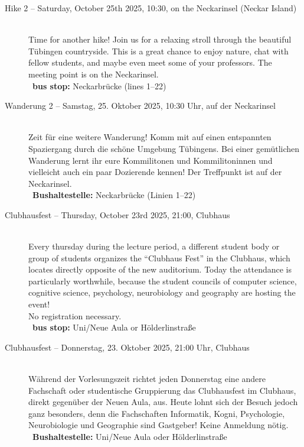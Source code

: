 \begin{description}
\ifml
    \item[Hike 2 -- Saturday, October 25th 2025, 10:30, on the Neckarinsel (Neckar Island)]~\\
    Time for another hike! Join us for a relaxing stroll through the beautiful Tübingen countryside.
    This is a great chance to enjoy nature, chat with fellow students, and maybe even meet some of your professors.
    The meeting point is on the Neckarinsel.\\
    ~\textbf{bus stop:} Neckarbrücke (lines 1--22)
\else
    \item[Wanderung 2 -- Samstag, 25. Oktober 2025, 10:30 Uhr, auf der Neckarinsel]~\\
    Zeit für eine weitere Wanderung! Komm mit auf einen entspannten Spaziergang durch die schöne Umgebung Tübingens.
    Bei einer gemütlichen Wanderung lernt ihr eure Kommilitonen und Kommilitoninnen
    und vielleicht auch ein paar Dozierende kennen!
    Der Treffpunkt ist auf der Neckarinsel.\\
    ~\textbf{Bushaltestelle:} Neckarbrücke (Linien 1--22)
\fi

\ifml
    \item[Clubhausfest -- Thursday, October 23rd 2025, 21:00, Clubhaus]\ \\
    Every thursday during the lecture period, a different student body or group of students organizes the "`Clubhaus Fest"' in
    the Clubhaus, which locates directly opposite of the new auditorium. Today the attendance is particularly worthwhile, because
    the student councils of computer science, cognitive science, psychology, neurobiology and geography are hosting the event! \\
    No registration necessary.\\
    ~\textbf{bus stop:} Uni/Neue Aula or Hölderlinstraße
\else
    \item[Clubhausfest -- Donnerstag, 23. Oktober 2025, 21:00 Uhr, Clubhaus]\ \\
    Während der Vorlesungszeit richtet jeden Donnerstag eine andere Fachschaft oder studentische Gruppierung das Clubhausfest
    im Clubhaus, direkt gegenüber der Neuen Aula, aus. Heute lohnt sich der Besuch jedoch ganz besonders, denn die Fachschaften
    Informatik, Kogni, Psychologie, Neurobiologie und Geographie sind Gastgeber! %
    Keine Anmeldung nötig.\\
    ~\textbf{Bushaltestelle:} Uni/Neue Aula oder Hölderlinstraße
\fi


\end{description}
